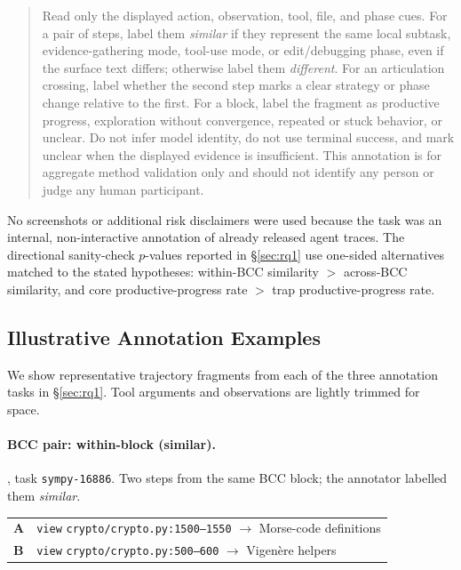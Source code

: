 \begin{quote}
Read only the displayed action, observation, tool, file, and phase cues.
For a pair of steps, label them \emph{similar} if they represent the same local subtask, evidence-gathering mode, tool-use mode, or edit/debugging phase, even if the surface text differs; otherwise label them \emph{different}.
For an articulation crossing, label whether the second step marks a clear strategy or phase change relative to the first.
For a block, label the fragment as productive progress, exploration without convergence, repeated or stuck behavior, or unclear.
Do not infer model identity, do not use terminal success, and mark unclear when the displayed evidence is insufficient.
This annotation is for aggregate method validation only and should not identify any person or judge any human participant.
\end{quote}

No screenshots or additional risk disclaimers were used because the task was an internal, non-interactive annotation of already released agent traces.
The directional sanity-check $p$-values reported in \S\ref{sec:rq1} use one-sided alternatives matched to the stated hypotheses: within-BCC similarity $>$ across-BCC similarity, and core productive-progress rate $>$ trap productive-progress rate.

\subsection{Illustrative Annotation Examples}
\label{app:annotation_cases}

We show representative trajectory fragments from each of the three annotation tasks in \S\ref{sec:rq1}.
Tool arguments and observations are lightly trimmed for space.

\paragraph{BCC pair: within-block (similar).}
\swe{}, task \texttt{sympy-16886}.
Two steps from the same BCC block; the annotator labelled them \emph{similar}.

\smallskip\noindent\small
\begin{tabularx}{\linewidth}{@{}l@{\;\;}X@{}}
\textbf{A} & \texttt{view} \texttt{crypto/crypto.py:1500--1550} $\to$ Morse-code definitions \\[2pt]
\textbf{B} & \texttt{view} \texttt{crypto/crypto.py:500--600} $\to$ Vigen\`ere helpers \\
\end{tabularx}
\normalsize

